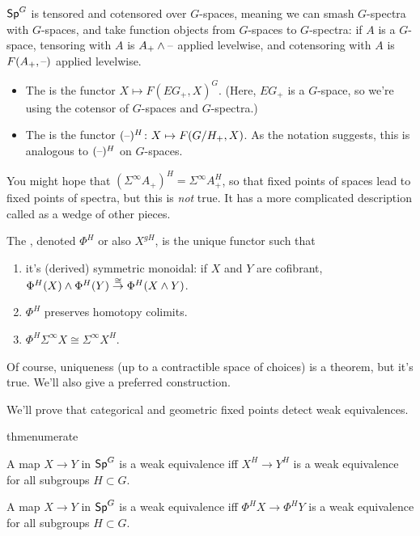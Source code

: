 $\mathsf{Sp}^G$ is tensored and cotensored over $G$-spaces, meaning we can smash $G$-spectra with $G$-spaces, and take
function objects from $G$-spaces to $G$-spectra: if $A$ is a $G$-space, tensoring with $A$ is $A_+\wedge\text{--}$
applied levelwise, and cotensoring with $A$ is $F(A_+,\text{--})$ applied levelwise.
\begin{defn}\hfill
\label{spectra_fixed_points}
\begin{itemize}
	\item The  is the functor $X\mapsto F(EG_+, X)^G$. (Here, $EG_+$ is a $G$-space, so
	we're using the cotensor of $G$-spaces and $G$-spectra.)
	\item The  is the functor $(\bl)^H\colon X\mapsto F(G/H_+, X)$. As the notation
	suggests, this is analogous to $(\text{--})^H$ on $G$-spaces.
\end{itemize}
\end{defn}
\begin{warn}
You might hope that $(\Sigma^\infty A_+)^H = \Sigma^\infty A_+^H$, so that fixed points of spaces lead to fixed
points of spectra, but this is \emph{not} true. It has a more complicated description called  as a wedge of other pieces.
\end{warn}
\begin{defn}
The , denoted $\Phi^H$ or also $X^{gH}$, is the unique functor
such that
\begin{enumerate}
	\item it's (derived) symmetric monoidal: if $X$ and $Y$ are cofibrant,
	$\Phi^H(X)\wedge\Phi^H(Y)\stackrel\cong\to\Phi^H(X\wedge Y)$.
	\item $\Phi^H$ preserves homotopy colimits.
	\item $\Phi^H\Sigma^\infty X \cong \Sigma^\infty X^H$.
\end{enumerate}
\end{defn}
Of course, uniqueness (up to a contractible space of choices) is a theorem, but it's true. We'll also give a
preferred construction.

We'll prove that categorical and geometric fixed points detect weak equivalences.
\begin{comp}{thm}{enumerate}
	\item A map $X\to Y$ in $\mathsf{Sp}^G$ is a weak equivalence iff $X^H\to Y^H$ is a weak equivalence for all subgroups
	$H\subset G$.
	\item A map $X\to Y$ in $\mathsf{Sp}^G$ is a weak equivalence iff $\Phi^H X\to \Phi^H Y$ is a weak equivalence for all
	subgroups $H\subset G$.
\end{comp}

